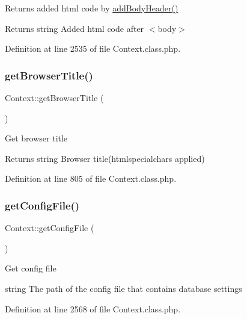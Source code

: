 Returns added html code by \hyperlink{classContext_ae7c9dad9ccd3e410283e21c67f395114}{add\+Body\+Header()}

\begin{DoxyReturn}{Returns}
string Added html code after $<$body$>$ 
\end{DoxyReturn}


Definition at line 2535 of file Context.\+class.\+php.

\mbox{\label{classContext_a19f432349a41af2ed36b2cd5e6ba96a5}} 
\subsubsection{\texorpdfstring{get\+Browser\+Title()}{getBrowserTitle()}}
{\footnotesize\ttfamily Context\+::get\+Browser\+Title (\begin{DoxyParamCaption}{ }\end{DoxyParamCaption})}

Get browser title

\begin{DoxyReturn}{Returns}
string Browser title(htmlspecialchars applied) 
\end{DoxyReturn}


Definition at line 805 of file Context.\+class.\+php.

\mbox{\label{classContext_a7ac0928e07cfc7f19f9a7341c50b4811}} 
\subsubsection{\texorpdfstring{get\+Config\+File()}{getConfigFile()}}
{\footnotesize\ttfamily Context\+::get\+Config\+File (\begin{DoxyParamCaption}{ }\end{DoxyParamCaption})}

Get config file

string The path of the config file that contains database settings 

Definition at line 2568 of file Context.\+class.\+php.

\mbox{\label{classContext_a1b14cb135e24cc9c79414a50575cf309}} 
